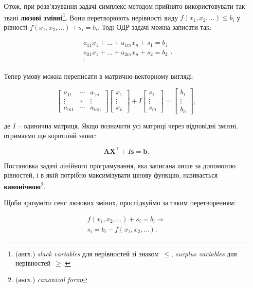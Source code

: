\documentclass[\main/book.tex]{subfiles}
\begin{document}
Отож, при розв'язування задачі симплекс-методом прийнято використовувати так звані \textbf{люзові змінні}\footnote{(англ.) \textit{slack variables} для нерівностей зі знаком~\flqq{}$\leq$\frqq{}, \textit{surplus variables} для нерівностей~\flqq{}$\geq$\frqq{}.}. Вони перетворюють нерівності виду ${f(x_1, x_2, \ldots) \leq b_i}$ у рівності ${ f(x_1, x_2, \ldots) + s_i = b_i }$. Тоді ОДР задачі можна записати так:

\[
 \begin{array}{l}
  a_{11} x_1 + \ldots + a_{1m} x_n + s_1 = b_1 \\
  a_{21} x_1 + \ldots + a_{2m} x_n + s_2 = b_2 \\
  \vdots
 \end{array}.
\]

Тепер умову можна переписати в матрично-векторному вигляді:

$$
 \left[
 \begin{array}{ccc}
  a_{11} & \cdots & a_{1n} \\
  \vdots & \ddots & \vdots \\
  a_{m1} & \cdots & a_{mn}
 \end{array}
 \right]
 \left[
 \begin{array}{c}
  x_1 \\ \vdots \\ x_n
 \end{array}
 \right] +
 I \left[
 \begin{array}{c}
  s_1 \\ \vdots \\ s_m
 \end{array}
 \right] =
 \left[
 \begin{array}{c}
  b_1 \\ \vdots \\ b_n
 \end{array}
 \right],
$$

де $I$ -- одинична матриця. Якщо позначити усі матриці через відповідні змінні, отримаємо ще коротший запис:

$$
\mathbf{A}\mathbf{X}^\top + I \mathbf{s} = \mathbf{b}.
$$

Постановка задачі лінійного програмування, яка записана лише за допомогою рівностей, і в якій потрібно максимізувати цінову функцію, називається \textbf{канонічною}\footnote{(англ.) \textit{canonical form}}.

Щоби зрозуміти сенс люзових зміних, прослідкуймо за таким перетворенням:

\begin{equation}
\begin{split}
 f(x_1, x_2, \ldots) + s_i = b_i \Rightarrow \\
 s_i = b_i - f(x_1, x_2, \ldots).
\end{split}
\label{eq:linear:slack_variables}
\end{equation}
\end{document}

